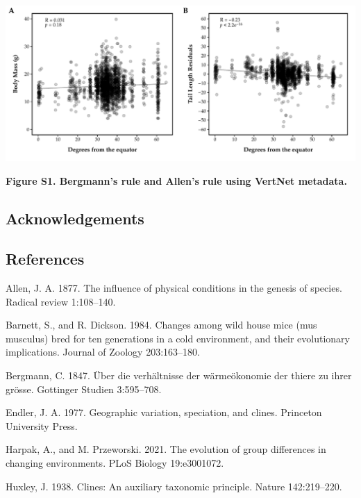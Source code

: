 \documentclass[]{article}
\begin{document}
\newpage

\includegraphics{../figures/VertNet_metadata.pdf}

\textbf{Figure S1. Bergmann's rule and Allen's rule using VertNet
metadata.}

\newpage

\hypertarget{acknowledgements}{%
\subsection{Acknowledgements}\label{acknowledgements}}

\newpage

\hypertarget{references}{%
\subsection{References}\label{references}}

\hypertarget{refs}{}
\leavevmode\hypertarget{ref-Allen1877}{}%
Allen, J. A. 1877. The influence of physical conditions in the genesis
of species. Radical review 1:108--140.

\leavevmode\hypertarget{ref-Barnett1984}{}%
Barnett, S., and R. Dickson. 1984. Changes among wild house mice (mus
musculus) bred for ten generations in a cold environment, and their
evolutionary implications. Journal of Zoology 203:163--180.

\leavevmode\hypertarget{ref-Bergmann1847}{}%
Bergmann, C. 1847. Über die verhältnisse der wärmeökonomie der thiere zu
ihrer grösse. Gottinger Studien 3:595--708.

\leavevmode\hypertarget{ref-Endler1977}{}%
Endler, J. A. 1977. Geographic variation, speciation, and clines.
Princeton University Press.

\leavevmode\hypertarget{ref-Harpak2021}{}%
Harpak, A., and M. Przeworski. 2021. The evolution of group differences
in changing environments. PLoS Biology 19:e3001072.

\leavevmode\hypertarget{ref-Huxley1938}{}%
Huxley, J. 1938. Clines: An auxiliary taxonomic principle. Nature
142:219--220.
\end{document}
